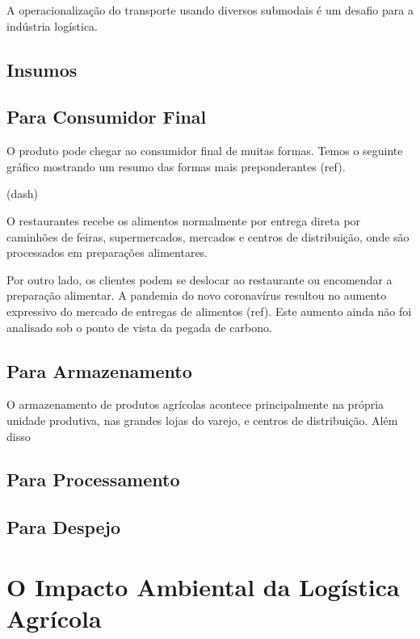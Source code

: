 \documentclass[]{article}
\begin{document}
	A operacionalização do transporte usando diversos submodais é um desafio para a indústria logística.   
	
	
	\subsection{Insumos}
	
	\subsection{Para Consumidor Final}
	
	O produto pode chegar ao consumidor final de muitas formas. Temos o seguinte gráfico mostrando um resumo das formas mais preponderantes (ref).
	
	(dash)
	
	O restaurantes recebe os alimentos normalmente por entrega direta por caminhões de feiras, supermercados, mercados e centros de distribuição, onde são processados em preparações alimentares.
	
	Por outro lado, os clientes podem se deslocar ao restaurante ou encomendar a preparação alimentar. A pandemia do novo coronavírus resultou no aumento expressivo do mercado de entregas de alimentos (ref). Este aumento ainda não foi analisado sob o ponto de vista da pegada de carbono. 
	
	
	
	\subsection{Para Armazenamento}
	
	O armazenamento de produtos agrícolas acontece principalmente na própria unidade produtiva, nas grandes lojas do varejo, e centros de distribuição. Além disso 
	
	\subsection{Para Processamento}
	
	\subsection{Para Despejo}
	
	
	\section{O Impacto Ambiental da Logística Agrícola}
	
\end{document}
